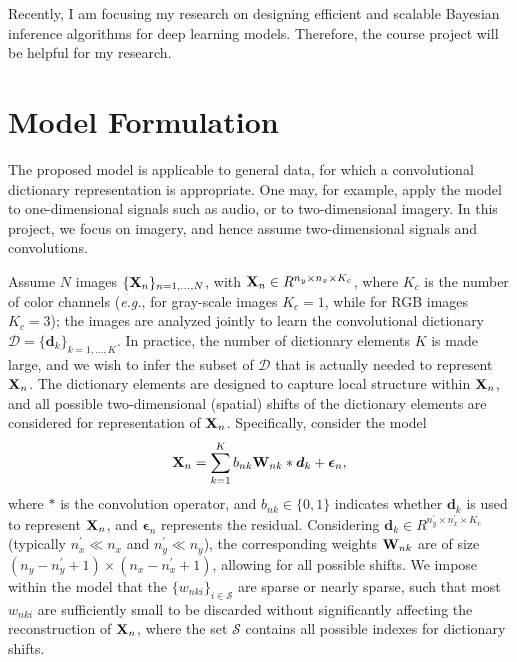 \documentclass{article} %
\newcommand{\Wmat}[0]{{{\bf W}}}
\newcommand{\Xmat}[0]{{{\bf X}}}
\newcommand{\dv}{\boldsymbol{d}}
\newcommand{\epsilonv}{\boldsymbol{\epsilon}}
\newcommand{\Dcal}{\mathcal{D}}
\newcommand{\Scal}{\mathcal{S}}
\begin{document}
Recently, I am focusing my research on designing efficient and scalable Bayesian inference algorithms for deep learning models. Therefore, the course project will be helpful for my research. 

\section{Model Formulation}
%
The proposed model is applicable to general data, for which a convolutional dictionary representation is appropriate. One may, for example, apply the model to one-dimensional signals such as audio, or to two-dimensional imagery. In this project, we focus on imagery, and hence assume two-dimensional signals and convolutions. 

Assume $N$ images $\{\Xmat_n\}_{n=1,\ldots,N}$, with $\Xmat_n \in R^{n_y \times n_x \times K_c}$, where $K_c$ is the number of color channels (\emph{e.g.}, for gray-scale images $K_c = 1$, while for RGB images $K_c = 3$); the images are analyzed jointly to learn the convolutional dictionary $\Dcal =\{\dv_k\}_{k=1,\ldots,K}$. In practice, the number of dictionary elements $K$ is made large, and we wish to infer the subset of $\Dcal$ that is actually needed to represent $\Xmat_n$. The dictionary elements are designed to capture local structure within $\Xmat_n$, and all possible two-dimensional (spatial) shifts of the dictionary elements are considered for representation of $\Xmat_n$. Specifically, consider the model
%
\begin{align}
\Xmat_n = \sum_{k=1}^K b_{nk} \Wmat_{nk} \ast \dv_{k}   + \epsilonv_{n},
\end{align}
%
where $\ast$ is the convolution operator, and $b_{nk} \in \{0,1\}$ indicates whether $\dv_k$ is used to represent $\Xmat_n$, and $\epsilonv_{n}$ represents the residual. Considering $\dv_k \in R^{n_y^{\prime} \times n_x^{\prime} \times K_c}$ (typically $n_x^{\prime} \ll n_x$ and $n_y^{\prime} \ll n_y$), the corresponding weights $ \Wmat_{nk}$ are of size $(n_y - n_y^{\prime}+1) \times (n_x - n_x^{\prime}+1)$, allowing for all possible shifts. We impose within the model that the $\{w_{nki}\}_{i\in \Scal}$ are sparse or nearly sparse, such that most $w_{nki}$ are sufficiently small to be discarded without significantly affecting the reconstruction of $\Xmat_n$, where the set $\Scal$ contains all possible indexes for dictionary shifts.
\end{document}
